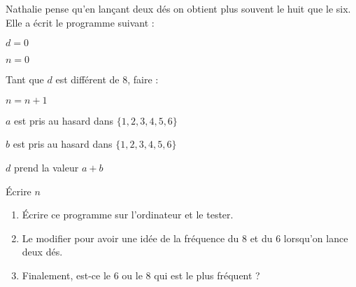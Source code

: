 
\begin{exercice}\label{exosmath-0586}

    Nathalie pense qu'en lançant deux dés on obtient plus souvent le huit que le six. Elle a écrit le programme suivant :

    \begin{fmpage}{0.9\linewidth}

    \( d=0\)

    \( n=0\)

    Tant que \( d\) est différent de \( 8\), faire :

    \hspace{0.5cm} \( n=n+1\)

    \hspace{0.5cm} \( a\) est pris au hasard dans \( \{ 1,2,3,4,5,6 \}\)

    \hspace{0.5cm} \( b\) est pris au hasard dans \( \{ 1,2,3,4,5,6 \}\)

    \hspace{0.5cm} \( d\) prend la valeur \( a+b\)

    Écrire \( n\)

\end{fmpage}

\begin{enumerate}
    \item
        Écrire ce programme sur l'ordinateur et le tester.
    \item
        Le modifier pour avoir une idée de la fréquence du \( 8\) et du \( 6\) lorsqu'on lance deux dés.
    \item
        Finalement, est-ce le \( 6\) ou le \( 8\) qui est le plus fréquent ?
\end{enumerate}

\end{exercice}
